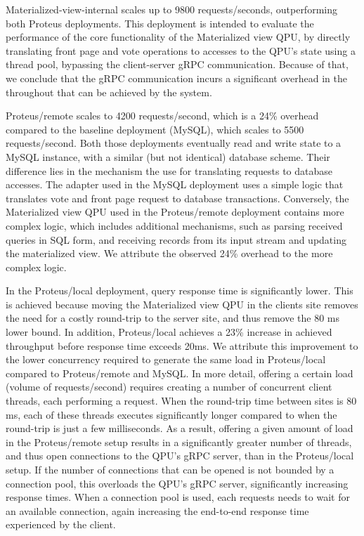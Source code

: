 Materialized-view-internal scales up to 9800 requests/seconds,
outperforming both Proteus deployments.
This deployment is intended to evaluate the performance of the core functionality of the Materialized view QPU,
by directly translating front page and vote operations to accesses to the QPU's state using a thread pool,
bypassing the client-server gRPC communication.
Because of that, we conclude that the gRPC communication incurs a significant overhead in the throughout that
can be achieved by the system.

Proteus/remote scales to 4200 requests/second, which is a 24\% overhead compared to the baseline deployment (MySQL),
which scales to 5500 requests/second.
Both those deployments eventually read and write state to a MySQL instance, with a similar (but not identical) database scheme.
Their difference lies in the mechanism the use for translating requests to database accesses.
The adapter used in the MySQL deployment uses a simple logic that translates vote and front page request to database transactions.
Conversely, the  Materialized view QPU used in the Proteus/remote deployment contains more complex logic,
which includes additional mechanisms,
such as parsing received queries in SQL form, and receiving records from its input stream and updating the materialized view.
We attribute the observed 24\% overhead to the more complex logic.

In the Proteus/local deployment, query response time is significantly lower.
This is achieved because moving the Materialized view QPU in the clients site removes the need for a costly round-trip to
the server site, and thus remove the 80 ms lower bound.
In addition, Proteus/local achieves a 23\% increase in achieved throughput before response time exceeds 20ms.
We attribute this improvement to the lower concurrency required to generate the same load in Proteus/local
compared to Proteus/remote and MySQL.
In more detail, offering a certain load (volume of requests/second) requires creating a number of concurrent client threads,
each performing a request.
When the round-trip time between sites is 80 ms, each of these threads executes significantly longer compared to
when the round-trip is just a few milliseconds.
As a result, offering a given amount of load in the Proteus/remote setup results in a significantly greater number
of threads, and thus open connections to the QPU's gRPC server, than in the Proteus/local setup.
If the number of connections that can be opened is not bounded by a connection pool, this overloads the QPU's gRPC server,
significantly increasing response times.
When a connection pool is used, each requests needs to wait for an available connection,
again increasing the end-to-end response time experienced by the client.

